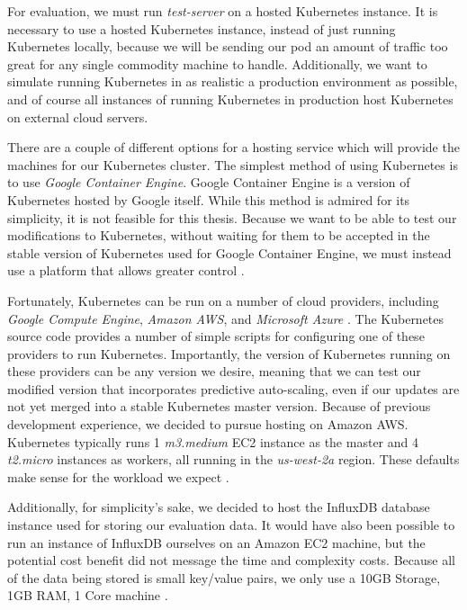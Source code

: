 For evaluation, we must run \textit{test-server} on a hosted Kubernetes
instance. It is necessary to use a hosted Kubernetes instance, instead of just
running Kubernetes locally, because we will be sending our pod an amount of
traffic too great for any single commodity machine to handle. Additionally, we
want to simulate running Kubernetes in as realistic a production environment as
possible, and of course all instances of running Kubernetes in production
host Kubernetes on external cloud servers.

There are a couple of different options for a hosting service which will provide
the machines for our Kubernetes cluster. The simplest method
of using Kubernetes is to use \textit{Google Container
Engine}. Google Container Engine is a version of Kubernetes hosted by Google
itself. While this method is admired for its simplicity, it is not
feasible for this thesis. Because we want to be able to test our modifications
to Kubernetes, without waiting for them to be accepted in the stable version of
Kubernetes used for Google Container Engine, we must instead use a platform that
allows greater control \cite{getting-started-k8s}.

Fortunately, Kubernetes can be run on a number of cloud providers, including
\textit{Google Compute Engine}, \textit{Amazon AWS}, and \textit{Microsoft
Azure} \cite{getting-started-k8s}.
The Kubernetes source code provides a number of simple scripts for
configuring one of these providers to run Kubernetes. Importantly, the version
of Kubernetes running on these providers can be any version we desire, meaning
that we can test our modified version that incorporates predictive auto-scaling,
even if our updates are not yet merged into a stable Kubernetes master version.
Because of previous development experience, we decided to
pursue hosting on Amazon AWS. Kubernetes typically runs 1 \textit{m3.medium}
EC2 instance as the master and 4 \textit{t2.micro} instances as workers, all
running in the \textit{us-west-2a} region. These defaults make
sense for the workload we expect \cite{getting-started-k8s-aws}.

Additionally, for simplicity's sake, we decided to host the InfluxDB database
instance used for storing our evaluation data. It would have also been possible
to run an instance of InfluxDB ourselves on an Amazon EC2 machine, but the
potential cost benefit did not message the time and complexity costs. Because
all of the data being stored is small key/value pairs, we only use a 10GB
Storage, 1GB RAM, 1 Core machine \cite{influxdb-pricing}.
